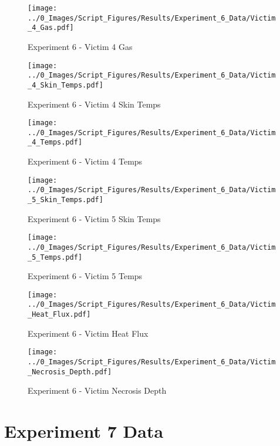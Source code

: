 	\begin{figure}[H]
		\centering
		\texttt{[image: ../0\_Images/Script\_Figures/Results/Experiment\_6\_Data/Victim\_4\_Gas.pdf]}
		\caption[]{Experiment 6 - Victim 4 Gas}
	\end{figure}
 
	\clearpage

	\begin{figure}[H]
		\centering
		\texttt{[image: ../0\_Images/Script\_Figures/Results/Experiment\_6\_Data/Victim\_4\_Skin\_Temps.pdf]}
		\caption[]{Experiment 6 - Victim 4 Skin Temps}
	\end{figure}
 

	\begin{figure}[H]
		\centering
		\texttt{[image: ../0\_Images/Script\_Figures/Results/Experiment\_6\_Data/Victim\_4\_Temps.pdf]}
		\caption[]{Experiment 6 - Victim 4 Temps}
	\end{figure}
 
	\clearpage

	\begin{figure}[H]
		\centering
		\texttt{[image: ../0\_Images/Script\_Figures/Results/Experiment\_6\_Data/Victim\_5\_Skin\_Temps.pdf]}
		\caption[]{Experiment 6 - Victim 5 Skin Temps}
	\end{figure}
 

	\begin{figure}[H]
		\centering
		\texttt{[image: ../0\_Images/Script\_Figures/Results/Experiment\_6\_Data/Victim\_5\_Temps.pdf]}
		\caption[]{Experiment 6 - Victim 5 Temps}
	\end{figure}
 
	\clearpage

	\begin{figure}[H]
		\centering
		\texttt{[image: ../0\_Images/Script\_Figures/Results/Experiment\_6\_Data/Victim\_Heat\_Flux.pdf]}
		\caption[]{Experiment 6 - Victim Heat Flux}
	\end{figure}
 

	\begin{figure}[H]
		\centering
		\texttt{[image: ../0\_Images/Script\_Figures/Results/Experiment\_6\_Data/Victim\_Necrosis\_Depth.pdf]}
		\caption[]{Experiment 6 - Victim Necrosis Depth}
	\end{figure}
 
	\clearpage

\clearpage		\large
\section{Experiment 7 Data} \label{App:Exp7Results} 

